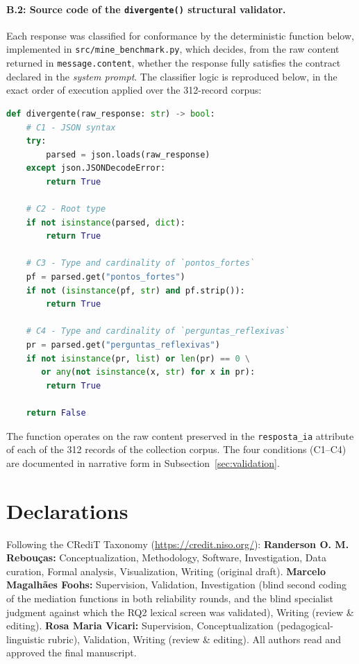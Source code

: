 \documentclass{sbc2023}%
\begin{document}
\paragraph{B.2: Source code of the \texttt{divergente()} structural validator.} Each response was classified for conformance by the deterministic function below, implemented in \texttt{src/mine\_benchmark.py}, which decides, from the raw content returned in \texttt{message.content}, whether the response fully satisfies the contract declared in the \textit{system prompt}. The classifier logic is reproduced below, in the exact order of execution applied over the 312-record corpus:

\begin{lstlisting}[language=Python]
def divergente(raw_response: str) -> bool:
    # C1 - JSON syntax
    try:
        parsed = json.loads(raw_response)
    except json.JSONDecodeError:
        return True

    # C2 - Root type
    if not isinstance(parsed, dict):
        return True

    # C3 - Type and cardinality of `pontos_fortes`
    pf = parsed.get("pontos_fortes")
    if not (isinstance(pf, str) and pf.strip()):
        return True

    # C4 - Type and cardinality of `perguntas_reflexivas`
    pr = parsed.get("perguntas_reflexivas")
    if not isinstance(pr, list) or len(pr) == 0 \
       or any(not isinstance(x, str) for x in pr):
        return True

    return False
\end{lstlisting}

The function operates on the raw content preserved in the \texttt{resposta\_ia} attribute of each of the 312 records of the collection corpus. The four conditions (C1--C4) are documented in narrative form in Subsection~\ref{sec:validation}.


\section*{Declarations}

\begin{contributions}
Following the CRediT Taxonomy (\href{https://credit.niso.org/}{https://credit.niso.org/}): \textbf{Randerson O. M. Rebouças:} Conceptualization, Methodology, Software, Investigation, Data curation, Formal analysis, Visualization, Writing (original draft). \textbf{Marcelo Magalhães Foohs:} Supervision, Validation, Investigation (blind second coding of the mediation functions in both reliability rounds, and the blind specialist judgment against which the RQ2 lexical screen was validated), Writing (review \& editing). \textbf{Rosa Maria Vicari:} Supervision, Conceptualization (pedagogical-linguistic rubric), Validation, Writing (review \& editing). All authors read and approved the final manuscript.
\end{contributions}
\end{document}

